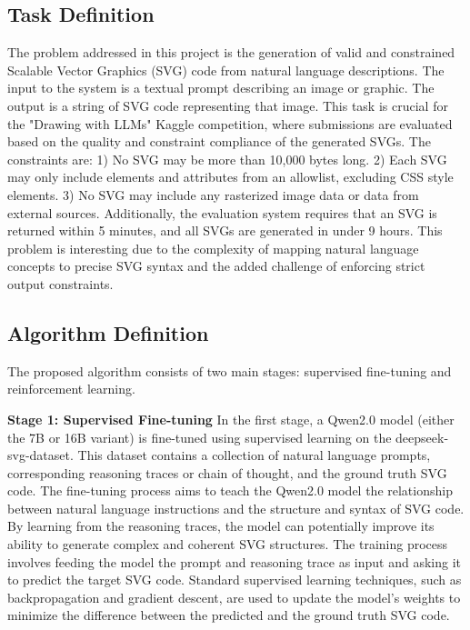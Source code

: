 \documentclass[11pt]{article}
\begin{document}
\subsection{Task Definition}
The problem addressed in this project is the generation of valid and constrained Scalable Vector Graphics (SVG) code from natural language descriptions. The input to the system is a textual prompt describing an image or graphic. The output is a string of SVG code representing that image. This task is crucial for the "Drawing with LLMs" Kaggle competition, where submissions are evaluated based on the quality and constraint compliance of the generated SVGs. The constraints are: 1) No SVG may be more than 10,000 bytes long. 2) Each SVG may only include elements and attributes from an allowlist, excluding CSS style elements. 3) No SVG may include any rasterized image data or data from external sources. Additionally, the evaluation system requires that an SVG is returned within 5 minutes, and all SVGs are generated in under 9 hours. This problem is interesting due to the complexity of mapping natural language concepts to precise SVG syntax and the added challenge of enforcing strict output constraints.

\subsection{Algorithm Definition}
The proposed algorithm consists of two main stages: supervised fine-tuning and reinforcement learning.

\textbf{Stage 1: Supervised Fine-tuning}
In the first stage, a Qwen2.0 model (either the 7B or 16B variant) is fine-tuned using supervised learning on the deepseek-svg-dataset. This dataset contains a collection of natural language prompts, corresponding reasoning traces or chain of thought, and the ground truth SVG code. The fine-tuning process aims to teach the Qwen2.0 model the relationship between natural language instructions and the structure and syntax of SVG code. By learning from the reasoning traces, the model can potentially improve its ability to generate complex and coherent SVG structures. The training process involves feeding the model the prompt and reasoning trace as input and asking it to predict the target SVG code. Standard supervised learning techniques, such as backpropagation and gradient descent, are used to update the model's weights to minimize the difference between the predicted and the ground truth SVG code.
\end{document}
